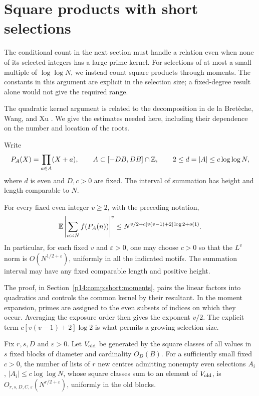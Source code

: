 \section{Square products with short selections}
\label{p13:short:section}

The conditional count in the next section must handle a relation
even when none of its selected integers has a large prime kernel.
For selections of at most a small multiple of \(\log\log N\),
we instead count square products through moments. The constants
in this argument are explicit in the selection size; a
fixed-degree result alone would not give the required range.

The quadratic kernel argument is related to the decomposition
in de la Bret\`eche, Wang, and Xu
\cite[Lemmas~6.2--6.3]{bretwngxu2026}. We give the estimates
needed here, including their dependence on the number and
location of the roots.


Write
\[
 P_A(X)=\prod_{a\in A}(X+a),\qquad
 A\subset[-DB,DB]\cap\mathbb Z,
 \qquad 2\le d=|A|\le c\log\log N,
\]
where $d$ is even and $D,c>0$ are fixed.  The interval of summation
has height and length comparable to $N$.

\begin{proposition}
\label{p13:short:moments}
For every fixed even integer \(v\ge2\), with the preceding notation,
\begin{equation}
 \mathbb E\left|\sum_{n\asymp N}f(P_A(n))\right|^v
 \le N^{v/2+c[v(v-1)+2]\log2+o(1)}.
 \label{p13:short:moment-bound}
\end{equation}
In particular, for each fixed \(v\) and \(\varepsilon>0\),
one may choose \(c>0\) so that the \(L^v\) norm is
\(O(N^{1/2+\varepsilon})\), uniformly in all the indicated
motifs. The summation interval may have any fixed comparable
length and positive height.
\end{proposition}

The proof, in Section~\ref{p14:comp:short:moments}, pairs the linear
factors into quadratics and controls the common kernel by their
resultant.  In the moment expansion, primes are assigned to the even
subsets of indices on which they occur.  Averaging the exposure order
then gives the exponent $v/2$.  The explicit term
$c[v(v-1)+2]\log2$ is what permits a growing selection size.

\begin{corollary}
\label{p13:short:old-space}
Fix \(r,s,D\) and \(\varepsilon>0\). Let \(V_{\rm old}\)
be generated by the square classes of all values in \(s\)
fixed blocks of diameter and cardinality \(O_D(B)\).
For a sufficiently small fixed \(c>0\), the number of
lists of \(r\) new centres admitting nonempty even
selections \(A_i\), \(|A_i|\le c\log\log N\), whose
square classes sum to an element of \(V_{\rm old}\), is
\(O_{r,s,D,C,\varepsilon}(N^{r/2+\varepsilon})\),
uniformly in the old blocks.
\end{corollary}

